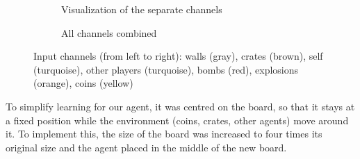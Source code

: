 
\begin{figure}
  \centering
  \begin{subfigure}[b]{0.6\textwidth}
    \centering
    \usebox{\largestimage}
    \caption{Visualization of the separate channels}
  \end{subfigure}
  \quad
  \begin{subfigure}[b]{0.36\textwidth}
    \centering
    \caption{All channels combined}
  \end{subfigure}
  \caption{Input channels (from left to right): walls (gray), crates (brown), self (turquoise), other players (turquoise), bombs (red), explosions (orange), coins (yellow)}
  \label{fig:input-channels}
\end{figure}


To simplify learning for our agent, it was centred on the board, so that it stays at a fixed position while the environment (coins, crates, other agents) move around it. To implement this, the size of the board was increased to four times its original size and the agent placed in the middle of the new board.
